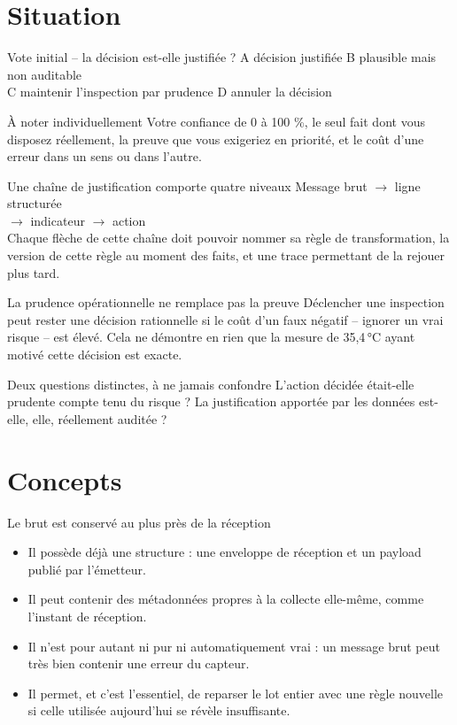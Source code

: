\documentclass[aspectratio=169]{beamer}
\begin{document}
\section{Situation}
\begin{frame}{Vote initial -- la décision est-elle justifiée ?}
A décision justifiée \quad B plausible mais non auditable\\[.5em]
C maintenir l'inspection par prudence \quad D annuler la décision
\begin{block}{À noter individuellement}
Votre confiance de 0 à 100 \%, le seul fait dont vous disposez réellement, la preuve que vous exigeriez en priorité, et le coût d'une erreur dans un sens ou dans l'autre.
\end{block}
\end{frame}

\begin{frame}{Une chaîne de justification comporte quatre niveaux}
\centering\Large Message brut $\rightarrow$ ligne structurée\\
$\rightarrow$ indicateur $\rightarrow$ action\\[1em]
\normalsize Chaque flèche de cette chaîne doit pouvoir nommer sa règle de transformation, la version de cette règle au moment des faits, et une trace permettant de la rejouer plus tard.
\end{frame}

\begin{frame}{La prudence opérationnelle ne remplace pas la preuve}
Déclencher une inspection peut rester une décision rationnelle si le coût d'un faux négatif -- ignorer un vrai risque -- est élevé. Cela ne démontre en rien que la mesure de 35,4\,°C ayant motivé cette décision est exacte.
\begin{alertblock}{Deux questions distinctes, à ne jamais confondre}
L'action décidée était-elle prudente compte tenu du risque ? La justification apportée par les données est-elle, elle, réellement auditée ?
\end{alertblock}
\end{frame}

\section{Concepts}
\begin{frame}{Le brut est conservé au plus près de la réception}
\begin{itemize}
\item Il possède déjà une structure : une enveloppe de réception et un payload publié par l'émetteur.
\item Il peut contenir des métadonnées propres à la collecte elle-même, comme l'instant de réception.
\item Il n'est pour autant ni pur ni automatiquement vrai : un message brut peut très bien contenir une erreur du capteur.
\item Il permet, et c'est l'essentiel, de reparser le lot entier avec une règle nouvelle si celle utilisée aujourd'hui se révèle insuffisante.
\end{itemize}
\end{frame}
\end{document}

